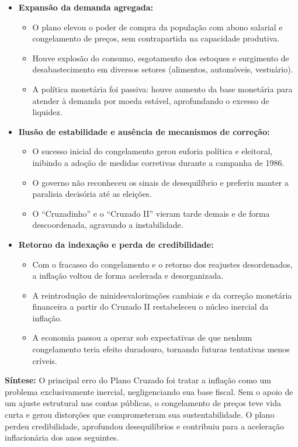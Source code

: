 \documentclass{sciposter}
\begin{document}
\begin{multicols}{3}
\begin{itemize}
    \item \textbf{ Expansão da demanda agregada:}
    \begin{itemize}
        \item O plano elevou o poder de compra da população com abono salarial e congelamento de preços, sem contrapartida na capacidade produtiva.
        \item Houve explosão do consumo, esgotamento dos estoques e surgimento de desabastecimento em diversos setores (alimentos, automóveis, vestuário).
        \item A política monetária foi passiva: houve aumento da base monetária para atender à demanda por moeda estável, aprofundando o excesso de liquidez.
    \end{itemize}

    \item \textbf{ Ilusão de estabilidade e ausência de mecanismos de correção:}
    \begin{itemize}
        \item O sucesso inicial do congelamento gerou euforia política e eleitoral, inibindo a adoção de medidas corretivas durante a campanha de 1986.
        \item O governo não reconheceu os sinais de desequilíbrio e preferiu manter a paralisia decisória até as eleições.
        \item O “Cruzadinho” e o “Cruzado II” vieram tarde demais e de forma descoordenada, agravando a instabilidade.
    \end{itemize}

    \item \textbf{ Retorno da indexação e perda de credibilidade:}
    \begin{itemize}
        \item Com o fracasso do congelamento e o retorno dos reajustes desordenados, a inflação voltou de forma acelerada e desorganizada.
        \item A reintrodução de minidesvalorizações cambiais e da correção monetária financeira a partir do Cruzado II restabeleceu o núcleo inercial da inflação.
        \item A economia passou a operar sob expectativas de que nenhum congelamento teria efeito duradouro, tornando futuras tentativas menos críveis.
    \end{itemize}
\end{itemize}

\textbf{Síntese:} O principal erro do Plano Cruzado foi tratar a inflação como um problema exclusivamente inercial, negligenciando sua base fiscal. Sem o apoio de um ajuste estrutural nas contas públicas, o congelamento de preços teve vida curta e gerou distorções que comprometeram sua sustentabilidade. O plano perdeu credibilidade, aprofundou desequilíbrios e contribuiu para a aceleração inflacionária dos anos seguintes.


\end{multicols}
\end{document}
